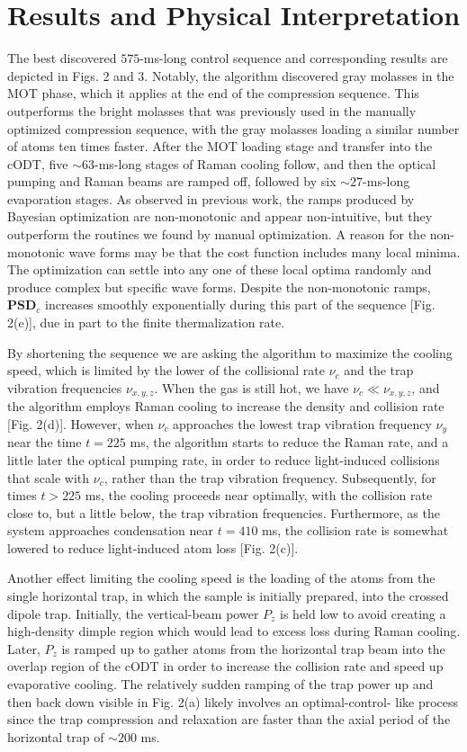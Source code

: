 \documentclass{article}
\begin{document}
\section{Results and Physical Interpretation}
The best discovered $575$-ms-long control sequence and corresponding results are depicted in Figs. 2 and 3. Notably, the algorithm discovered gray molasses in the MOT phase, which it applies at the end of the compression sequence. This outperforms the bright molasses that was previously used in the manually optimized compression sequence, with the gray molasses loading a similar number of atoms ten times faster. After the MOT loading stage and transfer into the cODT, five $\sim 63$-ms-long stages of Raman cooling follow, and then the optical pumping and Raman beams are ramped off, followed by six $\sim 27$-ms-long evaporation stages. As observed in previous work, the ramps produced by Bayesian optimization are non-monotonic and appear non-intuitive, but they outperform the routines we found by manual optimization. A reason for the non-monotonic wave forms may be that the cost function includes many local minima. The optimization can settle into any one of these local optima randomly and produce complex but specific wave forms. Despite the non-monotonic ramps, $\mathbf{PSD}_c$ increases smoothly exponentially during this part of the sequence [Fig. 2(e)], due in part to the finite thermalization rate.

By shortening the sequence we are asking the algorithm to maximize the cooling speed, which is limited by the lower of the collisional rate $\nu_c$ and the trap vibration frequencies $\nu_{x,y,z}$. When the gas is still hot, we have $\nu_c \ll \nu_{x,y,z}$, and the algorithm employs Raman cooling to increase the density and collision rate [Fig. 2(d)]. However, when $\nu_c$ approaches the lowest trap vibration frequency $\nu_y$ near the time $t = 225$ ms, the algorithm starts to reduce the Raman rate, and a little later the optical pumping rate, in order to reduce light-induced collisions that scale with $\nu_c$, rather than the trap vibration frequency. Subsequently, for times $t > 225$ ms, the cooling proceeds near optimally, with the collision rate close to, but a little below, the trap vibration frequencies. Furthermore, as the system approaches condensation near $t = 410$ ms, the collision rate is somewhat lowered to reduce light-induced atom loss [Fig. 2(c)].

Another effect limiting the cooling speed is the loading of the atoms from the single horizontal trap, in which the sample is initially prepared, into the crossed dipole trap. Initially, the vertical-beam power $P_z$ is held low to avoid creating a high-density dimple region which would lead to excess loss during Raman cooling. Later, $P_z$ is ramped up to gather atoms from the horizontal trap beam into the overlap region of the cODT in order to increase the collision rate and speed up evaporative cooling. The relatively sudden ramping of the trap power up and then back down visible in Fig. 2(a) likely involves an optimal-control- like process since the trap compression and relaxation are faster than the axial period of the horizontal trap of $\sim 200$ ms.
\end{document}
